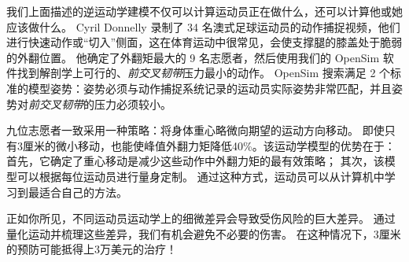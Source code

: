 我们上面描述的逆运动学建模不仅可以计算运动员正在做什么，还可以计算他或她应该做什么。
Cyril Donnelly 录制了 34 名澳式足球运动员的动作捕捉视频，他们进行快速动作或“切入”侧面，这在体育运动中很常见，会使支撑腿的膝盖处于脆弱的外翻位置\cite{donnelly2012optimizing}。
他确定了外翻矩最大的 9 名志愿者，然后使用我们的 OpenSim 软件找到解剖学上可行的、\textit{前交叉韧带}压力最小的动作。
OpenSim 搜索满足 2 个标准的模型姿势：姿势必须与动作捕捉系统记录的运动员实际姿势非常匹配，并且姿势对\textit{前交叉韧带}的压力必须较小。


九位志愿者一致采用一种策略：将身体重心略微向期望的运动方向移动。
即使只有3厘米的微小移动，也能使峰值外翻力矩降低40\%。该运动学模型的优势在于：
首先，它确定了重心移动是减少这些动作中外翻力矩的最有效策略；
其次，该模型可以根据每位运动员进行量身定制。
通过这种方式，运动员可以从计算机中学习到最适合自己的方法。


正如你所见，不同运动员运动学上的细微差异会导致受伤风险的巨大差异。
通过量化运动并梳理这些差异，我们有机会避免不必要的伤害。
在这种情况下，3厘米的预防可能抵得上3万美元的治疗！












